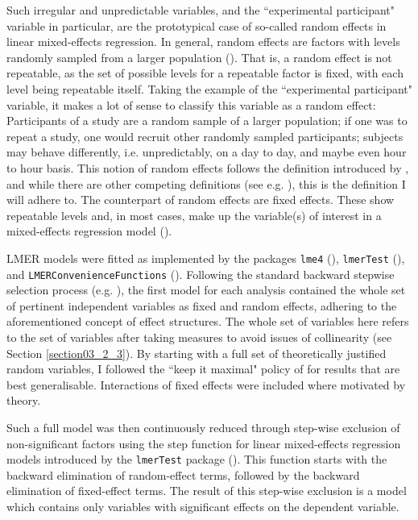 Such irregular and unpredictable variables, and the ``experimental participant" variable in particular, are the prototypical case of so-called random effects in linear mixed-effects regression. In general, random effects are factors with levels randomly sampled from a larger population (\cite{Baayen2008}). That is, a random effect is not repeatable, as the set of possible levels for a repeatable factor is fixed, with each level being repeatable itself. Taking the example of the ``experimental participant" variable, it makes a lot of sense to classify this variable as a random effect: Participants of a study are a random sample of a larger population; if one was to repeat a study, one would recruit other randomly sampled participants; subjects may behave differently, i.e. unpredictably, on a day to day, and maybe even hour to hour basis. This notion of random effects follows the definition introduced by \citet{Green1960}, and while there are other competing definitions (see e.g. \cite{Kreft1998, Searle2009, Snijders2011, McElreath2015}), this is the definition I will adhere to. The counterpart of random effects are fixed effects. These show repeatable levels and, in most cases, make up the variable(s) of interest in a mixed-effects regression model (\cite{Baayen2008}).

LMER models were fitted as implemented by the packages \texttt{lme4} (\cite{Bates2015}), \texttt{lmerTest} (\cite{Kuznetsova2017}), and \texttt{LMERConvenienceFunctions} (\cite{Tremblay2020}). Following the standard backward stepwise selection process (e.g. \cite{Baayen2008}), the first model for each analysis contained the whole set of pertinent independent variables as fixed and random effects, adhering to the aforementioned concept of effect structures. The whole set of variables here refers to the set of variables after taking measures to avoid issues of collinearity (see Section \ref{section03_2_3}). By starting with a full set of theoretically justified random variables, I followed the ``keep it maximal" policy of \citet{Barr2013} for results that are best generalisable. Interactions of fixed effects were included where motivated by theory.

Such a full model was then continuously reduced through step-wise exclusion of non-significant factors using the step function for linear mixed-effects regression models introduced by the \texttt{lmerTest} package (\cite{Kuznetsova2017}). This function starts with the backward elimination of random-effect terms, followed by the backward elimination of fixed-effect terms. The result of this step-wise exclusion is a model which contains only variables with significant effects on the dependent variable.

